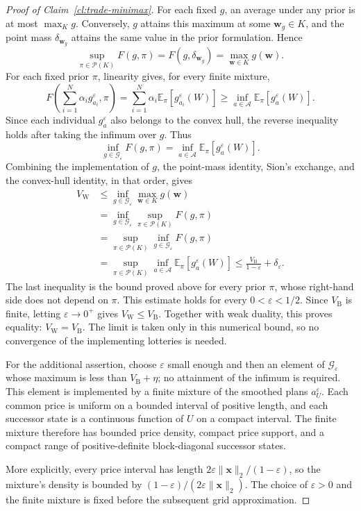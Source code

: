 \documentclass[11pt]{article}
\newcommand{\Esub}[2]{\mathbb E_{#1}\left[#2\right]}
\newcommand{\norm}[1]{\lVert #1\rVert_2}
\newcommand{\bx}{\boldsymbol x}
\begin{document}
\begin{proof}[Proof of Claim~\ref{cl:trade-minimax}]
For each fixed $g$, an average under any prior is at most $\max_K g$. Conversely, $g$ attains this maximum at some $\boldsymbol w_g\in K$, and the point mass $\delta_{\boldsymbol w_g}$ attains the same value in the prior formulation. Hence
\[
 \sup_{\pi\in\mathcal P(K)}F(g,\pi)
 =F(g,\delta_{\boldsymbol w_g})
 =\max_{\boldsymbol w\in K}g(\boldsymbol w).
\]
For each fixed prior $\pi$, linearity gives, for every finite mixture,
\[
 F\!\left(\sum_{i=1}^N\alpha_i g_{a_i}^\varepsilon,\pi\right)
 =\sum_{i=1}^N\alpha_i\Esub{\pi}{g_{a_i}^\varepsilon(W)}
 \ge\inf_{a\in\mathcal A}\Esub{\pi} {g_a^\varepsilon(W)}.
\]
Since each individual $g_a^\varepsilon$ also belongs to the convex hull, the reverse inequality holds after taking the infimum over $g$. Thus
\[
 \inf_{g\in\mathcal G_\varepsilon}F(g,\pi)
 =\inf_{a\in\mathcal A}\Esub{\pi}{g_a^\varepsilon(W)}.
\]
Combining the implementation of $g$, the point-mass identity, Sion's exchange, and the convex-hull identity, in that order, gives
\[
 \begin{aligned}
 V_{\mathrm W}
 &\le\inf_{g\in\mathcal G_\varepsilon}\max_{\boldsymbol w\in K}g(\boldsymbol w)\\
 &=\inf_{g\in\mathcal G_\varepsilon}\sup_{\pi\in\mathcal P(K)}F(g,\pi)\\
 &=\sup_{\pi\in\mathcal P(K)}\inf_{g\in\mathcal G_\varepsilon}F(g,\pi)\\
 &=\sup_{\pi\in\mathcal P(K)}\inf_{a\in\mathcal A} \Esub{\pi}{g_a^\varepsilon(W)}
 \le\frac{V_{\mathrm B}}{1-\varepsilon}+\delta_\varepsilon.
 \end{aligned}
\]
The last inequality is the bound proved above for every prior $\pi$, whose right-hand side does not depend on $\pi$. This estimate holds for every $0<\varepsilon<1/2$. Since $V_{\mathrm B}$ is finite, letting $\varepsilon\to 0^+$ gives $V_{\mathrm W}\le V_{\mathrm B}$. Together with weak duality, this proves equality: $V_{\mathrm W}=V_{\mathrm B}$. The limit is taken only in this numerical bound, so no convergence of the implementing lotteries is needed.


For the additional assertion, choose $\varepsilon$ small enough and then an element of $\mathcal G_\varepsilon$ whose maximum is less than $V_{\mathrm{B}}+\eta$; no attainment of the infimum is required. This element is implemented by a finite mixture of the smoothed plans $a_U^\varepsilon$. Each common price is uniform on a bounded interval of positive length, and each successor state is a continuous function of $U$ on a compact interval. The finite mixture therefore has bounded price density, compact price support, and a compact range of positive-definite block-diagonal successor states.

More explicitly, every price interval has length $2\varepsilon\norm{\bx}/(1-\varepsilon)$, so the mixture's density is bounded by $(1-\varepsilon)/(2\varepsilon\norm{\bx})$. The choice of $\varepsilon>0$ and the finite mixture is fixed before the subsequent grid approximation.
\end{proof}
\end{document}
